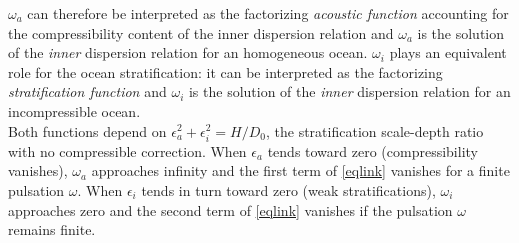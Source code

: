 \documentclass[a4paper,11pt]{article}
\begin{document}
$\omega_a$ can therefore be interpreted as the factorizing \textit{acoustic function} accounting for the compressibility content of the inner dispersion relation and $\omega_a$ is the solution of the \textit{inner} dispersion relation for an homogeneous ocean. $\omega_i$ plays an equivalent role for the ocean stratification: it can be interpreted as the factorizing \textit{stratification function} and $\omega_i$ is the solution of the \textit{inner} dispersion relation for an incompressible ocean.\\
Both functions depend on $\epsilon_a^2+\epsilon_i^2 = H/D_0$, the stratification scale-depth ratio with no compressible correction. 
When $\epsilon_a$ tends toward zero (compressibility vanishes), $\omega_a$ approaches infinity and the first term of \ref{eqlink} vanishes for a finite pulsation $\omega$. 
When $\epsilon_i$ tends in turn toward zero (weak stratifications), $\omega_i$ approaches zero and the second term of \ref{eqlink} vanishes if the pulsation $\omega$ remains finite. 
\end{document}
